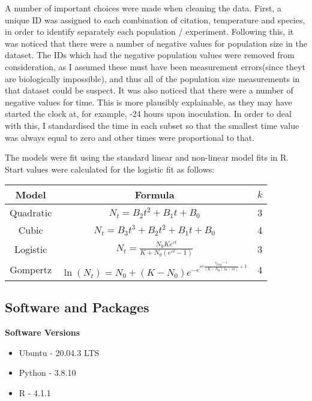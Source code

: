 \documentclass[11pt,a4wide,titlepage]{article}
\begin{document}
A number of important choices were made when cleaning the data. First, a unique ID was assigned to each combination of citation, temperature and species, in order to identify separately each population / experiment. Following this, it was noticed that there were a number of negative values for population size in the dataset. The IDs which had the negative population values were removed from consideration, as I assumed these must have been measurement errors(since theyt are biologically impossible), and thus all of the population size measurements in that dataset could be suspect. It was also noticed that there were a number of negative values for time. This is more plausibly explainable, as they may have started the clock at, for example, -24 hours upon inoculation. In order to deal with this, I standardised the time in each subset so that the smallest time value was always equal to zero and other times were proportional to that.

The models were fit using the standard linear and non-linear model fits in R. Start values were calculated for the logistic fit as follows: 

\begin{center}
	\def\arraystretch{2}
	\begin{tabular}{|c|c|c|}
		\hline
		Model & Formula & $k$\\
		\hline
		Quadratic & $N_t = B_2t^2 + B_1t + B_0$ & 3\\
		Cubic & $N_t = B_3t^3 + B_2t^2 + B_1t + B_0$ & 4\\
		Logistic & $N_t = \frac{N_0Ke^{rt}}{K + N_0(e^{rt} - 1)}$ & 3\\
		Gompertz & $\ln(N_t) = N_0 + (K - N_0)e^{-e^{re\frac{t_{lag} - t}{(K - N_0)\ln(10)} + 1}}$ & 4\\
		\hline
	\end{tabular}
\end{center}



\subsection*{Software and Packages}
\textbf{Software Versions}
\begin{itemize}
    \item Ubuntu - 20.04.3 LTS
    \item Python - 3.8.10
    \item R - 4.1.1
\end{itemize}
\end{document}

